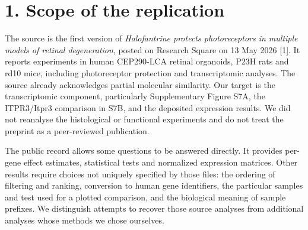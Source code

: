 \documentclass[a4paper,10pt]{article}
\begin{document}
\section*{1. Scope of the replication}
The source is the first version of \emph{Halofantrine protects photoreceptors in multiple models of retinal degeneration}, posted on Research Square on 13 May 2026 [1]. It reports experiments in human CEP290-LCA retinal organoids, P23H rats and rd10 mice, including photoreceptor protection and transcriptomic analyses. The source already acknowledges partial molecular similarity. Our target is the transcriptomic component, particularly Supplementary Figure S7A, the ITPR3/Itpr3 comparison in S7B, and the deposited expression results. We did not reanalyse the histological or functional experiments and do not treat the preprint as a peer-reviewed publication.

The public record allows some questions to be answered directly. It provides per-gene effect estimates, statistical tests and normalized expression matrices. Other results require choices not uniquely specified by those files: the ordering of filtering and ranking, conversion to human gene identifiers, the particular samples and test used for a plotted comparison, and the biological meaning of sample prefixes. We distinguish attempts to recover those source analyses from additional analyses whose methods we chose ourselves.
\end{document}
